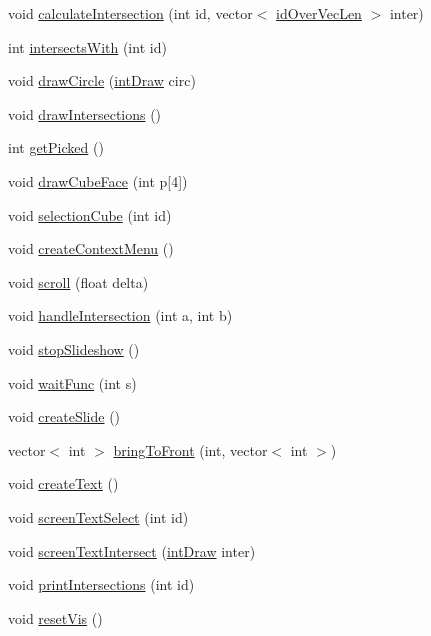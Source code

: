 \begin{DoxyCompactItemize}
\item 
void \mbox{\hyperlink{classvis_a8f646ff6bfeadb0ba8543377d46eb994}{calculate\+Intersection}} (int id, vector$<$ \mbox{\hyperlink{structid_over_vec_len}{id\+Over\+Vec\+Len}} $>$ inter)
\item 
int \mbox{\hyperlink{classvis_a0c4056a3b0c2526049078a8b454864f2}{intersects\+With}} (int id)
\item 
void \mbox{\hyperlink{classvis_a1b2fbed076352ace06cf7cbec8146be3}{draw\+Circle}} (\mbox{\hyperlink{structint_draw}{int\+Draw}} circ)
\item 
void \mbox{\hyperlink{classvis_aca1eb70cb49a572f7d34916aec3d95da}{draw\+Intersections}} ()
\item 
int \mbox{\hyperlink{classvis_a9d1f882814f73ee4e49dbeb7102b008c}{get\+Picked}} ()
\item 
void \mbox{\hyperlink{classvis_a279ffabf91a5426cbfafd520d19edd45}{draw\+Cube\+Face}} (int p\mbox{[}4\mbox{]})
\item 
void \mbox{\hyperlink{classvis_a86ece524e0bee2bf1c7741169f4d2ee9}{selection\+Cube}} (int id)
\item 
void \mbox{\hyperlink{classvis_a63af66f730f0f06f36d255bcc7a7a244}{create\+Context\+Menu}} ()
\item 
void \mbox{\hyperlink{classvis_addb1c0bca50661279c4ddaa441b54da5}{scroll}} (float delta)
\item 
void \mbox{\hyperlink{classvis_a43ad888fa6478686d0cd81daa849ffd8}{handle\+Intersection}} (int a, int b)
\item 
void \mbox{\hyperlink{classvis_a74dfdd319ae733d8ff96aa60bccd65b7}{stop\+Slideshow}} ()
\item 
void \mbox{\hyperlink{classvis_ad6c62a2b38cc7d1cd5c9c62ce7c37c0d}{wait\+Func}} (int s)
\item 
void \mbox{\hyperlink{classvis_a131dcf83ee61359b99624ea2538898a4}{create\+Slide}} ()
\item 
vector$<$ int $>$ \mbox{\hyperlink{classvis_a2a60b45f440459d64a059a4e85b83957}{bring\+To\+Front}} (int, vector$<$ int $>$)
\item 
void \mbox{\hyperlink{classvis_a78b843a2656d5f9a9747cde2aa728f51}{create\+Text}} ()
\item 
void \mbox{\hyperlink{classvis_add33479c093e0128dc708bd766556ba9}{screen\+Text\+Select}} (int id)
\item 
void \mbox{\hyperlink{classvis_a14c9c1ba23785bc482c78c05c025ca84}{screen\+Text\+Intersect}} (\mbox{\hyperlink{structint_draw}{int\+Draw}} inter)
\item 
void \mbox{\hyperlink{classvis_a9d087bde79e6856772dc3a1f6f89294e}{print\+Intersections}} (int id)
\item 
void \mbox{\hyperlink{classvis_a1ba44b07a81d5d205011112ea58d1252}{reset\+Vis}} ()
\end{DoxyCompactItemize}
